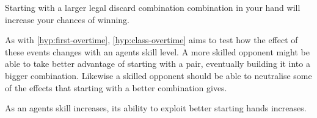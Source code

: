 \documentclass[../main.tex]{subfiles}
\begin{document}
\begin{hyp} \label{hyp:hand-class}
Starting with a larger legal discard combination combination in your hand will increase your chances of winning.
\end{hyp}

As with \cref{hyp:first-overtime}, \cref{hyp:class-overtime} aims to test how the effect of these events changes with an agents skill level. A more skilled opponent might be able to take better advantage of starting with a pair, eventually building it into a bigger combination. Likewise a skilled opponent should be able to neutralise some of the effects that starting with a better combination gives. 

\begin{hyp} \label{hyp:class-overtime}
As an agents skill increases, its ability to exploit better starting hands increases.
\end{hyp}
\end{document}
